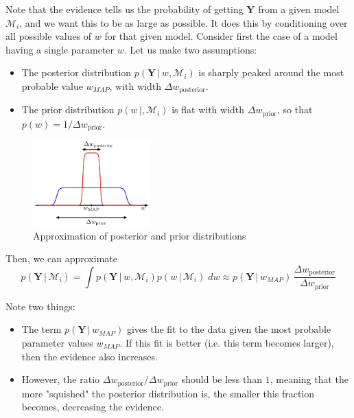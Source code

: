 \documentclass{article}
\begin{document}
    Note that the evidence tells us the probability of getting $\mathbf{Y}$ from a given model $\mathcal{M}_i$, and we want this to be as large as possible. It does this by conditioning over all possible values of $w$ for that given model. Consider first the case of a model having a single parameter $w$. Let us make two assumptions:
    \begin{itemize}
      \item The posterior distribution $p(\mathbf{Y}\,|\,w, \mathcal{M}_i)$ is sharply peaked around the most probable value $w_{MAP}$, with width $\Delta w_{\text{posterior}}$.
      \item The prior distribution $p(w\,|,\mathcal{M}_i)$ is flat with width $\Delta w_{\text{prior}}$, so that $p(w) = 1/ \Delta w_{\text{prior}}$.
    \end{itemize}

    \begin{figure}[H]
      \centering
      \includegraphics[width=0.4\textwidth]{img/approximation.jpg}
      \caption{Approximation of posterior and prior distributions}
    \end{figure}

    Then, we can approximate
    \begin{equation}
      p(\mathbf{Y}\,|\,\mathcal{M}_i) = \int p(\mathbf{Y}\,|\,w, \mathcal{M}_i) p(w\,|\,\mathcal{M}_i)\; dw \approx p(\mathbf{Y}\,|\,w_{MAP}) \, \frac{\Delta w_{\text{posterior}}}{\Delta w_{\text{prior}}}
    \end{equation}

    Note two things:
    \begin{itemize}
      \item The term $p(\mathbf{Y}\,|\,w_{MAP})$ gives the fit to the data given the most probable parameter values $w_{MAP}$. If this fit is better (i.e. this term becomes larger), then the evidence also increases.
      \item However, the ratio $\Delta w_{\text{posterior}}/\Delta w_{\text{prior}}$ should be less than $1$, meaning that the more "squished" the posterior distribution is, the smaller this fraction becomes, decreasing the evidence.
    \end{itemize}
\end{document}

